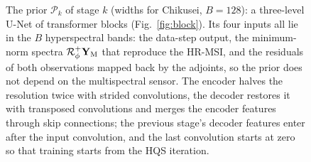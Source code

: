 \begin{figure}[t]
{}
\caption{The prior $\mathcal{P}_k$ of stage $k$ (widths for Chikusei, $B=128$): a three-level U-Net of transformer blocks (Fig.~\ref{fig:block}). Its four inputs all lie in the $B$ hyperspectral bands: the data-step output, the minimum-norm spectra $\mathcal{R}_\phi^{+}\mathbf{Y}_{\mathrm{M}}$ that reproduce the HR-MSI, and the residuals of both observations mapped back by the adjoints, so the prior does not depend on the multispectral sensor. The encoder halves the resolution twice with strided convolutions, the decoder restores it with transposed convolutions and merges the encoder features through skip connections; the previous stage's decoder features enter after the input convolution, and the last convolution starts at zero so that training starts from the HQS iteration.}
\label{fig:prior}
\end{figure}
